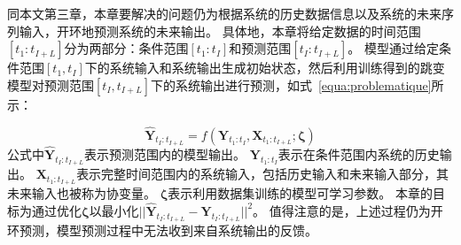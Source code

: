 同本文第三章，本章要解决的问题仍为根据系统的历史数据信息以及系统的未来序列输入，开环地预测系统的未来输出。
具体地，本章将给定数据的时间范围$[t_1:t_{I+L}]$分为两部分：条件范围$[t_1:t_{I}]$和预测范围$[t_{I}:t_{I+L}]$。
模型通过给定条件范围$[t_1, t_I]$下的系统输入和系统输出生成初始状态，然后利用训练得到的跳变模型对预测范围$[t_{I}, t_{I+L}]$下的系统输出进行预测，如式~\ref{equa:problematique}所示：

\begin{equation}
\label{equa:problematique}
    \hat{\boldsymbol Y}_{t_{I}:t_{I+L}} = f(\boldsymbol Y_{t_{1}:t_{I}}, \boldsymbol X_{t_{1}:t_{I+L}};\boldsymbol \zeta) 
\end{equation}
公式中$\hat{\boldsymbol Y}_{t_{I}:t_{I+L}}$表示预测范围内的模型输出。 
$\boldsymbol Y_{t_{1}:t_{I}}$表示在条件范围内系统的历史输出。
$\boldsymbol X_{t_{1}:t_{I+L}}$表示完整时间范围内的系统输入，包括历史输入和未来输入部分，其未来输入也被称为协变量\cite{Wu2020}。
$\boldsymbol \zeta$表示利用数据集训练的模型可学习参数。
本章的目标为通过优化$\boldsymbol \zeta$以最小化$||\hat{\boldsymbol Y}_{t_{I}:t_{I+L}}-\boldsymbol {Y}_{t_{I}:t_{I+L}}||^2$。
值得注意的是，上述过程仍为开环预测，模型预测过程中无法收到来自系统输出的反馈。

